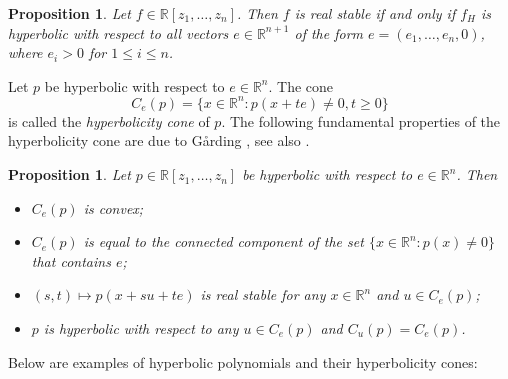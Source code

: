 \documentclass[10pt,reqno]{amsart}
\theoremstyle{plain}
\newtheorem{proposition}[theorem]{Proposition}
\theoremstyle{definition}
\theoremstyle{remark}
\newcommand{\RR}{\mathbb{R}}
\begin{document}
\begin{proposition}\label{hyp-stab}
Let $f \in \RR[z_1,\ldots, z_n]$. Then $f$ is real stable if and only if 
$f_H$ is hyperbolic with respect to all vectors $e \in \RR^{n+1}$ of the form 
$e=(e_1, \ldots, e_n, 0)$, where $e_i>0$ for $1 \leq i \leq n$. 
\end{proposition} 

Let $p$ be hyperbolic with respect to $e\in\RR^n$. The cone 
$$
C_e(p)=\{x \in \RR^n : p(x+te) \neq 0, t \geq 0\}
$$
is called the {\em hyperbolicity cone} of $p$. The following fundamental 
properties of the hyperbolicity cone are due to G\aa rding \cite{garding}, 
see also \cite{ABG,guler,hormander}. 

\begin{proposition}\label{fund-hyp}
Let $p \in \RR[z_1,\ldots,z_n]$ be hyperbolic with respect to $e\in\RR^n$. 
Then 
\begin{itemize}
\item[(a)] $C_e(p)$ is convex; 
\item[(b)] $C_e(p)$ is equal to the connected component of the set 
$\{ x \in \RR^n : p(x) \neq 0\}$ that contains $e$;
\item[(c)] $(s,t)\mapsto p(x+su+te)$ is real stable for any $x\in \RR^n$ 
and $u\in C_e(p)$; 
\item[(d)] $p$ is hyperbolic with respect to any $u\in C_e(p)$ and 
$C_u(p)=C_e(p)$.
\end{itemize}
\end{proposition}

Below are examples of hyperbolic polynomials and their hyperbolicity 
cones: 
\end{document}
